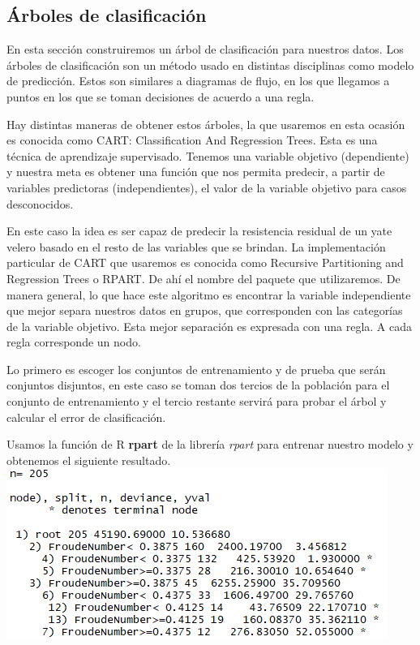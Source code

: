 \documentclass[twoside]{article}
\begin{document}
\begin{multicols}{2}
\subsection{\'Arboles de clasificaci\'on}
En esta secci\'on construiremos un \'arbol de clasificaci\'on para nuestros datos. Los \'arboles de clasificaci\'on son un m\'etodo usado en distintas disciplinas como modelo de predicci\'on. Estos son similares a diagramas de flujo, en los que llegamos a puntos en los que se toman decisiones de acuerdo a una regla.

Hay distintas maneras de obtener estos \'arboles, la que usaremos en esta ocasi\'on es conocida como CART: Classification And Regression Trees. Esta es una t\'ecnica de aprendizaje supervisado. Tenemos una variable objetivo (dependiente) y nuestra meta es obtener una funci\'on que nos permita predecir, a partir de variables predictoras (independientes), el valor de la variable objetivo para casos desconocidos.

En este caso la idea es ser capaz de predecir la resistencia residual de un yate velero basado en el resto de las variables que se brindan. La implementaci\'on particular de CART que usaremos es conocida como Recursive Partitioning and Regression Trees o RPART. De ah\'i el nombre del paquete que utilizaremos. De manera general, lo que hace este algoritmo es encontrar la variable independiente que mejor separa nuestros datos en grupos, que corresponden con las categor\'ias de la variable objetivo. Esta mejor separaci\'on es expresada con una regla. A cada regla corresponde un nodo.

Lo primero es escoger los conjuntos de entrenamiento y de prueba que ser\'an conjuntos disjuntos, en este caso se toman dos tercios de la poblaci\'on para el conjunto de entrenamiento y el tercio restante servir\'a para probar el \'arbol y calcular el error de clasificaci\'on.

Usamos la funci\'on de R \textbf{rpart} de la librer\'ia \textit{rpart} para entrenar nuestro modelo y obtenemos el siguiente resultado.\\

\includegraphics[scale=0.5]{images/pic_36.png} \\


\end{multicols}
\end{document}

